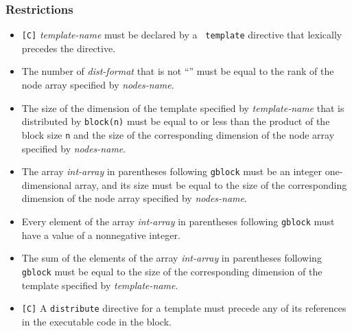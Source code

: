 \subsubsection*{Restrictions}

\begin{itemize}
 \item \verb![C]! {\it template-name} must be declared by a {\tt
       template} directive that lexically precedes the directive.
 \item The number of {\it dist-format} that is not ``{\tt *}'' must be
       equal to the rank of the node array specified by {\it nodes-name}.  
 \item The size of the dimension of the template specified by {\it
       template-name} that is distributed by {\tt block(n)} must be
       equal to or less than the product of the block size {\tt n} and
       the size of the corresponding dimension of the node array
       specified by {\it nodes-name}.
 \item The array {\it int-array} in parentheses following {\tt gblock}
       must be an integer one-dimensional array, and its size must be
       equal to the size of the corresponding dimension of the node array
       specified by {\it nodes-name}.
 \item Every element of the array {\it int-array} in parentheses
       following {\tt gblock} must have a value of a nonnegative integer.
 \item The sum of the elements of the array {\it int-array} in 
       parentheses following {\tt gblock} must be equal to the size of
       the corresponding dimension of the template specified by {\it
       template-name}.
 \item \verb![C]! A {\tt distribute} directive for a template must
       precede any of its references in the executable code in the block.
\end{itemize}

